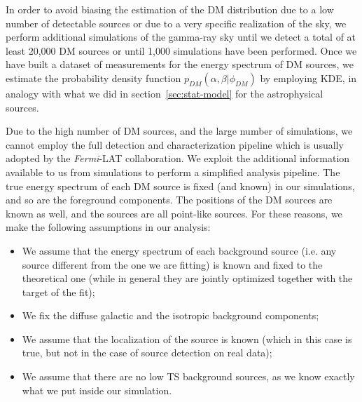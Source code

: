 \documentclass[12pt, a4paper]{article}
\newcommand{\aure}[1]{\textcolor{orange}{[AA: #1]}}
\newcommand{\dima}[1]{\textcolor{purple}{{Dima: #1}}}
\newcommand{\Fermi}{{\textit{Fermi}}}
\begin{document}
In order to avoid biasing the estimation of the DM distribution due to a low number of detectable sources or due to a very specific realization of the sky, we perform additional simulations of the gamma-ray sky until we detect a total of at least 20,000 DM sources or until 1,000 simulations have been performed. 
Once we have built a dataset of measurements for the energy spectrum of DM sources, we estimate the probability density function $p_{DM}(\alpha, \beta|\phi_{DM})$ by employing KDE, in analogy with what we did in section~\ref{sec:stat-model} for the astrophysical sources.



Due to the high number of DM sources, and the large number of simulations, we cannot employ the full detection and characterization pipeline which is usually adopted by the \Fermi-LAT collaboration.
We exploit the additional information available to us from simulations to perform a simplified %
analysis pipeline. 
The true energy spectrum of each DM source is fixed (and known) in our simulations, and so are the foreground components. The positions of the DM sources are known as well, and the sources are all point-like sources. For these reasons, we make the following assumptions in our analysis:
\begin{itemize}
    \item We assume that the energy spectrum of each background source (i.e. any source different from the one we are fitting) is known and fixed to the theoretical one (while in general they are jointly optimized together with the target of the fit);
    \item We fix the diffuse galactic and the isotropic background components;
    \item We assume that the localization of the source is known (which in this case is true, but not in the case of source detection on real data);
    \item We assume that there are no low TS background sources, as we know exactly what we put inside our simulation.
\end{itemize}
\end{document}
